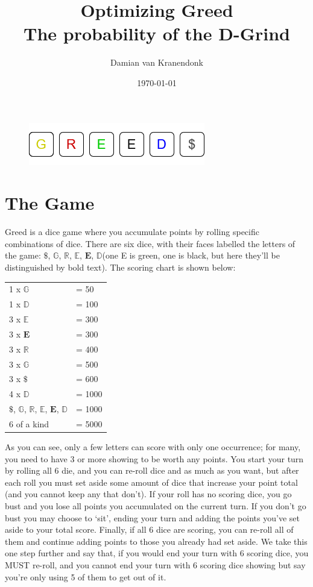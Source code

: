 \documentclass[a4paper]{article}
\title{%
	Optimizing Greed \\
	\large The probability of the D-Grind}
\author{Damian van Kranendonk}
\date{\today}
\newcommand{\game}{\ensuremath{\mathbb{\$}}\xspace}
\newcommand{\gameg}{\ensuremath{\mathbb{G}}\xspace}
\newcommand{\gamer}{\ensuremath{\mathbb{R}}\xspace}
\newcommand{\gamee}{\ensuremath{\mathbb{E}}\xspace}
\newcommand{\gamebe}{\ensuremath{\mathbf{E}}\xspace}
\newcommand{\gamed}{\ensuremath{\mathbb{D}}\xspace}
\begin{document}
\maketitle
\newpage
\begin{figure}[h]
	\centering
	\includegraphics[scale=0.7]{Logo.png}
\end{figure}
\section{The Game}

Greed is a dice game where you accumulate points by rolling specific combinations of dice. There are six dice, with their faces labelled the letters of the game: \game, \gameg, \gamer, \gamee, \gamebe, \gamed (one E is green, one is black, but here they'll be distinguished by bold text). The scoring chart is shown below:

\begin{table}[h]
\begin{tabular}{ll}
1 x \gameg & = 50 \\
1 x \gamed & = 100 \\
3 x \gamee & = 300 \\
3 x \gamebe & = 300 \\
3 x \gamer & = 400 \\
3 x \gameg & = 500 \\
3 x \game & = 600 \\
4 x \gamed & = 1000 \\
\game, \gameg, \gamer, \gamee, \gamebe, \gamed & = 1000 \\
6 of a kind & = 5000
\end{tabular}
\end{table}

As you can see, only a few letters can score with only one occurrence; for many, you need to have 3 or more showing to be worth any points. You start your turn by rolling all 6 die, and you can re-roll dice and as much as you want, but after each roll you must set aside some amount of dice that increase your point total (and you cannot keep any that don't). If your roll has no scoring dice, you go bust and you lose all points you accumulated on the current turn. If you don't go bust you may choose to `sit', ending your turn and adding the points you've set aside to your total score. Finally, if all 6 dice are scoring, you can re-roll all of them and continue adding points to those you already had set aside. We take this one step further and say that, if you would end your turn with 6 scoring dice, you MUST re-roll, and you cannot end your turn with 6 scoring dice showing but say you're only using 5 of them to get out of it. \\
\end{document}
